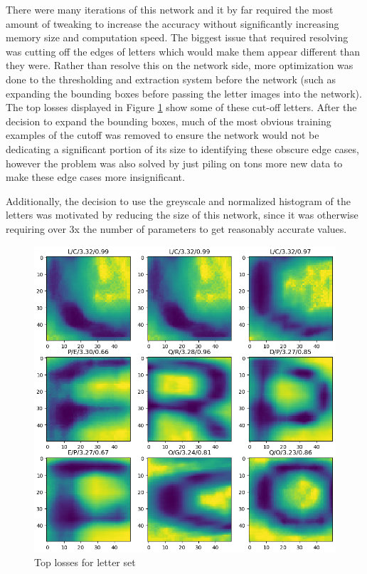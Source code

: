 \documentclass[titlepage, twocolumn]{article}
\begin{document}
There were many iterations of this network and it by far required the most amount of tweaking to increase the accuracy without significantly increasing memory size and computation speed. The biggest issue that required resolving was cutting off the edges of letters which would make them appear different than they were. Rather than resolve this on the network side, more optimization was done to the thresholding and extraction system before the network (such as expanding the bounding boxes before passing the letter images into the network). The top losses displayed in Figure \ref{fig:lettersloss} show some of these cut-off letters. After the decision to expand the bounding boxes, much of the most obvious training examples of the cutoff was removed to ensure the network would not be dedicating a significant portion of its size to identifying these obscure edge cases, however the problem was also solved by just piling on tons more new data to make these edge cases more insignificant.

Additionally, the decision to use the greyscale and normalized histogram of the letters was motivated by reducing the size of this network, since it was otherwise requiring over 3x the number of parameters to get reasonably accurate values.  

\begin{figure}[H]
    \centering
    \includegraphics[width=0.9\linewidth]{LetterTopLoss.png}
    \caption{Top losses for letter set}
    \label{fig:lettersloss}
\end{figure}
\end{document}
